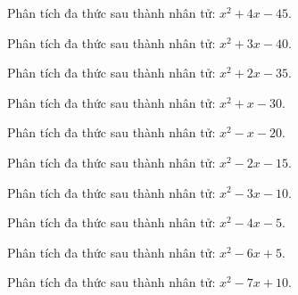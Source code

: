 \begin{bt}
	Phân tích đa thức sau thành nhân tử: $x^2 + 4 x - 45$.
\end{bt}
\begin{bt}
	Phân tích đa thức sau thành nhân tử: $x^2 + 3 x - 40$.
\end{bt}
\begin{bt}
	Phân tích đa thức sau thành nhân tử: $x^2 + 2 x - 35$.
\end{bt}
\begin{bt}
	Phân tích đa thức sau thành nhân tử: $x^2 + x - 30$.
\end{bt}
\begin{bt}
	Phân tích đa thức sau thành nhân tử: $x^2 - x - 20$.
\end{bt}
\begin{bt}
	Phân tích đa thức sau thành nhân tử: $x^2 - 2 x - 15$.
\end{bt}
\begin{bt}
	Phân tích đa thức sau thành nhân tử: $x^2 - 3 x - 10$.
\end{bt}
\begin{bt}
	Phân tích đa thức sau thành nhân tử: $x^2 - 4 x - 5$.
\end{bt}
\begin{bt}
	Phân tích đa thức sau thành nhân tử: $x^2 - 6 x + 5$.
\end{bt}
\begin{bt}
	Phân tích đa thức sau thành nhân tử: $x^2 - 7 x + 10$.
\end{bt}
